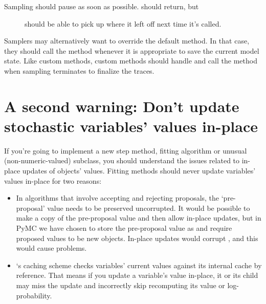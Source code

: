 \documentclass[letterpaper,10pt,english]{sphinxmanual}
\begin{document}
\begin{description}
\begin{description}
\begin{description}
\end{description}

\item[{\code{'paused'}:}] \leavevmode\begin{description}
\item[{Sampling should pause as soon as possible.  should return, but}] \leavevmode
should be able to pick up where it left off next time it's called.

\end{description}

\end{description}

\end{description}

Samplers may alternatively want to override the default  method. In that case, they should call the  method whenever it is appropriate to save the current model state. Like custom  methods, custom  methods should handle  and call the  method when sampling terminates to finalize the traces.


\section{A second warning: Don't update stochastic variables' values in-place}
\label{extending:a-second-warning-don-t-update-stochastic-variables-values-in-place}\label{extending:dont-update-in-place}
If you're going to implement a new step method, fitting algorithm or unusual (non-numeric-valued)  subclass, you should understand the issues related to in-place updates of  objects' values. Fitting methods should never update variables' values in-place for two reasons:
\begin{itemize}
\item {} 
In algorithms that involve accepting and rejecting proposals, the `pre-proposal' value needs to be preserved uncorrupted. It would be possible to make a copy of the pre-proposal value and then allow in-place updates, but in PyMC we have chosen to store the pre-proposal value as  and require proposed values to be new objects. In-place updates would corrupt , and this would cause problems.

\item {} 
`s caching scheme checks variables' current values against its internal cache by reference. That means if you update a variable's value in-place, it or its child may miss the update and incorrectly skip recomputing its value or log-probability.

\end{itemize}
\end{document}

